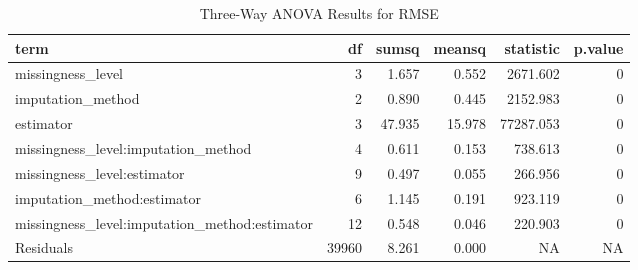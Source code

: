 \begin{table}[!h]
\centering
\caption{Three-Way ANOVA Results for RMSE}
\centering
\begin{tabular}[t]{lrrrrr}
\toprule
term & df & sumsq & meansq & statistic & p.value\\
\midrule
missingness\_level & 3 & 1.657 & 0.552 & 2671.602 & 0\\
imputation\_method & 2 & 0.890 & 0.445 & 2152.983 & 0\\
estimator & 3 & 47.935 & 15.978 & 77287.053 & 0\\
missingness\_level:imputation\_method & 4 & 0.611 & 0.153 & 738.613 & 0\\
missingness\_level:estimator & 9 & 0.497 & 0.055 & 266.956 & 0\\
\addlinespace
imputation\_method:estimator & 6 & 1.145 & 0.191 & 923.119 & 0\\
missingness\_level:imputation\_method:estimator & 12 & 0.548 & 0.046 & 220.903 & 0\\
Residuals & 39960 & 8.261 & 0.000 & NA & NA\\
\bottomrule
\end{tabular}
\end{table}
